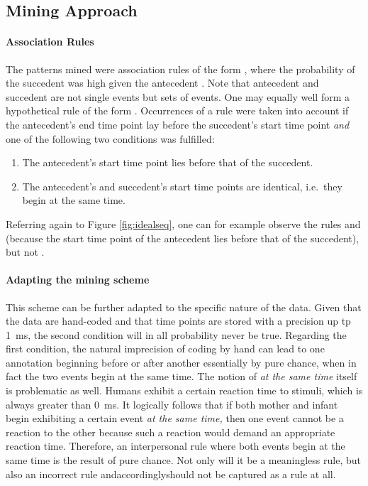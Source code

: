 \subsection{Mining Approach}
\label{ssec:miningmethodapproach}

\paragraph{Association Rules}
The patterns \citet{rohlfing18} mined were association rules of the form , where the probability of the succedent  was high given the antecedent . Note that antecedent and succedent are not single events but sets of events. One may equally well form a hypothetical rule of the form . Occurrences of a rule were taken into account if the antecedent's end time point lay before the succedent's start time point \emph{and} one of the following two conditions was fulfilled:

\begin{enumerate}
	\item The antecedent's start time point lies before that of the succedent.
	\item The antecedent's and succedent's start time points are identical, i.e.\ they begin at the same time.
\end{enumerate}

Referring again to Figure \ref{fig:idealseq}, one can for example observe the rules  and  (because the start time point of the antecedent lies before that of the succedent), but not .

\paragraph{Adapting the mining scheme}
This scheme can be further adapted to the specific nature of the data. Given that the data are hand-coded and that time points are stored with a precision up tp 1~ms, the second condition will in all probability never be true. Regarding the first condition, the natural imprecision of coding by hand can lead to one annotation beginning before or after another essentially by pure chance, when in fact the two events begin at the same time. The notion of \emph{at the same time} itself is problematic as well. Humans exhibit a certain reaction time to stimuli, which is always greater than 0~ms. It logically follows that if both mother and infant begin exhibiting a certain event \emph{at the same time,} then one event cannot be a reaction to the other because such a reaction would demand an appropriate reaction time. Therefore, an interpersonal rule where both events begin at the same time is the result of pure chance. Not only will it be a meaningless rule, but also an incorrect rule and\dash accordingly\dash should not be captured as a rule at all.

